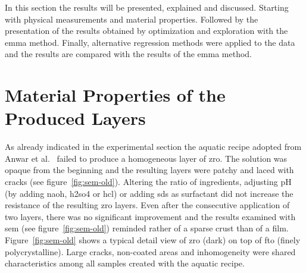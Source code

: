 In this section the results will be presented, explained and discussed.
Starting with physical measurements and material properties.
Followed by the presentation of the results obtained by optimization and exploration with the \gls{emma} method. 
Finally, alternative regression methods were applied to the data and the results are compared with the results of the \gls{emma} method. 

\section{Material Properties of the Produced Layers}
\label{sec:res-mat}
As already indicated in the experimental section the aquatic recipe adopted from Anwar et al.~\cite{Anwar2017} failed to produce a homogeneous layer of \gls{zro}.
The solution was opaque from the beginning and the resulting layers were patchy and laced with cracks (see figure~\ref{fig:sem-old}). 
Altering the ratio of ingredients, adjusting pH (by adding \gls{naoh}, \gls{h2so4} or \gls{hcl}) or adding \gls{sds} as surfactant did not increase the resistance of the resulting \gls{zro} layers. 
Even after the consecutive application of two layers, 
there was no significant improvement and the results examined with \gls{sem} (see figure~\ref{fig:sem-old}) reminded rather of a sparse crust than of a film. 
%
Figure~\ref{fig:sem-old} shows a typical detail view of \gls{zro} (dark) on top of \gls{fto} (finely polycrystalline). 
Large cracks, non-coated areas and inhomogeneity were 
shared characteristics among 
all samples created with the aquatic recipe. 

